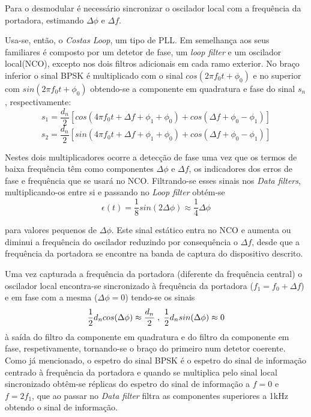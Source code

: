 \documentclass[11pt]{article}
\numberwithin{equation}{section}
\begin{document}
 Para o desmodular é necessário sincronizar o oscilador local com a frequência da portadora, estimando $\Delta\phi$ e $\Delta f$.

Usa-se, então, o \textit{Costas Loop}, um tipo de PLL. Em semelhança aos seus familiares é composto por um detetor de fase, um \textit{loop filter} e um oscilador local(NCO), excepto nos dois filtros adicionais em cada ramo exterior. No braço inferior o sinal BPSK é multiplicado com o sinal $cos(2\pi f_0t+\phi_0)$ e no superior com $sin(2\pi f_0t+ \phi_0)$ obtendo-se a componente em quadratura e fase do sinal $s_n$, respectivamente: 
\begin{equation}
s_1=\frac{d_n}{2}[cos(4\pi f_0t+\Delta f+\phi_1+\phi_0)+cos(\Delta f+\phi_0-\phi_1)]
\end{equation}
\begin{equation}
s_2=\frac{d_n}{2}[sin(4\pi f_0t+\Delta f+\phi_1+\phi_0)+cos(\Delta f+\phi_0-\phi_1)]
\end{equation} 

Nestes dois multiplicadores ocorre a detecção de fase uma vez que os termos de baixa frequência têm como componentes $\Delta\phi$ e $\Delta f$, os indicadores dos erros de fase e frequência que se usará no NCO. Filtrando-se esses sinais nos \textit{Data filters}, multiplicando-os entre si e passando no \textit{Loop filter} obtém-se 
\begin{equation}
\epsilon(t)=\frac{1}{8}sin(2\Delta\phi)\approx\frac{1}{4}\Delta\phi
\end{equation}

para valores pequenos de $\Delta\phi$. Este sinal estático entra no NCO e aumenta ou diminui a frequência do oscilador reduzindo por consequência o $\Delta f$, desde que a frequência da portadora se encontre na banda de captura do dispositivo descrito.

Uma vez capturada a frequência da portadora (diferente da frequência central) o oscilador local encontra-se sincronizado à frequência da portadora ($f_1 = f_0+\Delta f$) e em fase com a mesma ($\Delta\phi=0$) tendo-se os sinais
\begin{equation}
\frac{1}{2}d_ncos(\Delta\phi)\approx\dfrac{d_n}{2} \hspace{1mm}, \hspace{1mm} \frac{1}{2}d_nsin(\Delta\phi)\approx 0
\end{equation}
à saída do filtro da componente em quadratura e do filtro da componente em fase, respetivamente, tornando-se o braço do primeiro num detetor coerente. Como já mencionado, o espetro do sinal BPSK é o espetro do sinal de informação centrado à frequência da portadora e quando se multiplica pelo sinal local sincronizado obtêm-se réplicas do espetro do sinal de informação a $f=0$ e $f=2f_1$, que ao passar no \textit{Data filter} filtra as componentes superiores a 1kHz obtendo o sinal de informação.
\end{document}
